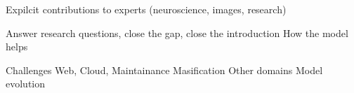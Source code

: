 
Expilcit contributions to experts (neuroscience, images, research)

Answer research questions, close the gap, close the introduction
How the model helps


Challenges
Web,
Cloud,
Maintainance
Masification
Other domains
Model evolution
